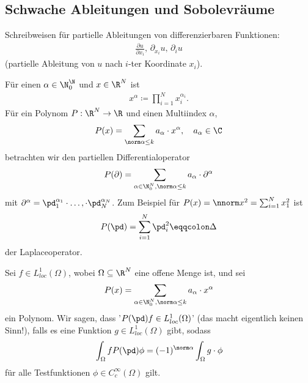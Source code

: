 \subsection{Schwache Ableitungen und Sobolevräume}
\label{sec:schw-able-und}

Schreibweisen für partielle Ableitungen von differenzierbaren Funktionen:
\begin{align*}
  \frac{\partial u}{\partial x_{i}}, \, \partial_{x_{i}} u, \, \partial_{i} u
\end{align*}
(partielle Ableitung von $u$ nach $i$-ter Koordinate $x_{i}$). 

Für einen  $\alpha \in \N_{0}^{\N}$ und $x \in \R^{N}$ ist
\begin{align*}
  x^{\alpha}\coloneqq \prod_{i = 1}^{N} x_{i}^{\alpha_{i}}. 
\end{align*}
Für ein Polynom $P: \R^{N} \to \R$ und einen Multiindex $\alpha$,
\begin{align*}
  P(x) = \sum_{\norm \alpha\leq k} a_{\alpha}\cdot x^{\alpha}, \quad a_{\alpha} \in \C
\end{align*}
betrachten wir den partiellen Differentialoperator
\begin{align*}
  P(\partial) = \sum_{\alpha \in \N_{0}^{N}, \norm \alpha \leq k} a_{\alpha}\cdot \partial^{\alpha}
\end{align*}
mit $\partial^{\alpha} = \pd_{1}^{\alpha_{1}} \cdot \dots, \cdot \pd_{N}^{\alpha_{N}}$. Zum Beispiel für $P(x) = \nnorm x^{2} = \sum_{i = 1}^{N} x_{1}^{2}$ ist
\begin{align*}
  P(\pd) = \sum_{i = 1}^{N} \pd_{i}^{2} \eqqcolon \Delta
\end{align*}
der Laplaceoperator. 

Sei $f \in L^{1}_{loc}(\Omega)$, wobei $\Omega \subseteq \R^{N}$ eine offene Menge ist, und sei
\begin{align*}
  P(x) =  \sum_{\alpha \in \N_{0}^{N}, \norm \alpha \leq k} a_{\alpha}\cdot x^{\alpha}
\end{align*}
ein Polynom. Wir sagen, dass '$P(\pd)f \in L^{1}_{loc}(\Omega)$' (das macht eigentlich keinen Sinn!), falls es eine Funktion $g \in L^{1}_{loc}(\Omega)$ gibt, sodass
\begin{align*}
  \int_{\Omega}f P(\pd) \phi = (-1)^{\norm \alpha} \int_{\Omega} g\cdot\phi
\end{align*}
für alle Testfunktionen $\phi \in C_{c}^{\infty}(\Omega)$ gilt. 

